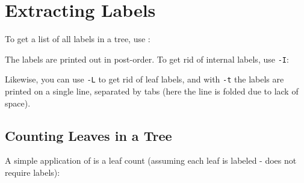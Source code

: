 

\section{Extracting Labels}
\label{sct_labels}

To get a list of all labels in a tree, use :




\noindent{}The labels are printed out in post-order. To get rid of internal labels, use \texttt{-I}:




\noindent{}Likewise, you can use \texttt{-L} to get rid of leaf labels, and
with \texttt{-t} the labels are printed on a single line, separated by tabs (here the line is folded due to lack of space).




\subsection{Counting Leaves in a Tree}
\label{sct_counting_leaves}

A simple application of  is a leaf count (assuming each leaf is
labeled - \nw{} does not require labels):




